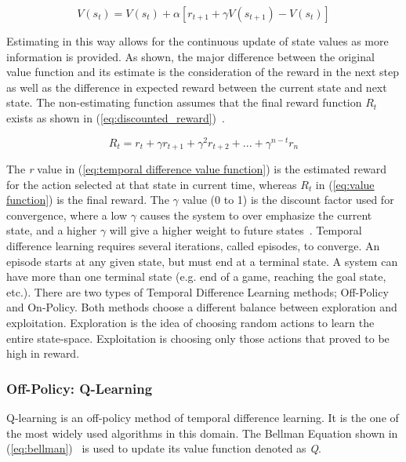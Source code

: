 \documentclass[12pt,american]{report}
\begin{document}
        \begin{equation}
            \label{eq:temporal difference value function}
            V(s_{t}) = V(s_{t}) + \alpha[r_{t+1} + \gamma V(s_{t+1})-V(s_{t})]
        \end{equation}

        Estimating in this way allows for the continuous update of state values as more information is provided. As shown, the major difference between the original value function and its estimate is the consideration of the reward in the next step as well as the difference in expected reward between the current state and next state. The non-estimating function assumes that the final reward function \textit{$R_{t}$} exists as shown in (\ref{eq:discounted_reward})~\cite{matiisen_2015}.

        \begin{equation}
            \label{eq:discounted_reward}
            R_{t} = r_t + \gamma r_{t+1} + \gamma^2 r_{t+2} + ... + \gamma^{n-t}r_n 
        \end{equation}

        The \textit{r} value in (\ref{eq:temporal difference value function}) is the estimated reward for the action selected at that state in current time, whereas \textit{$R_t$} in (\ref{eq:value function}) is the final reward.  The \begin{math}\gamma\end{math} value (0 to 1) is the discount factor used for convergence, where a low \begin{math}\gamma\end{math} causes the system to over emphasize the current state, and a higher \begin{math}\gamma\end{math} will give a higher weight to future states~\cite{Eden}. Temporal difference learning requires several iterations, called episodes, to converge. An episode starts at any given state, but must end at a terminal state.  A system can have more than one terminal state (e.g. end of a game, reaching the goal state, etc.). There are two types of Temporal Difference Learning methods; Off-Policy and On-Policy.  Both methods choose a different balance between exploration and exploitation.  Exploration is the idea of choosing random actions to learn the entire state-space.  Exploitation is choosing only those actions that proved to be high in reward.

        
        \subsubsection{Off-Policy: Q-Learning}
        Q-learning is an off-policy method of temporal difference learning. It is the one of the most widely used algorithms in this domain. The Bellman Equation shown in (\ref{eq:bellman})~\cite{matiisen_2015} is used to update its value function denoted as \textit{Q}.
\end{document}
